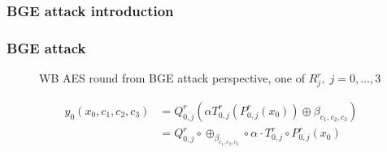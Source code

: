 \documentclass{beamer}
\begin{document}
\subsubsection{BGE attack introduction}
\begin{frame}
  \frametitle{BGE attack}
    \begin{figure}
    \begin{center}
    \leavevmode
    \centerline{}
    \end{center}
    \caption{WB AES round from BGE attack perspective, one of $R^r_j,\; j=0,\dots,3$}
    \label{fig:aes_round_bge}
    \end{figure} 

     \begin{equation} \label{eq:y0}    
    \begin{aligned}
    y_0\left(x_0, c_1, c_2, c_3 \right) &= Q^r_{0,j} \left(\alpha T^r_{0,j}\left(P^r_{0,j}\left(x_0\right)\right) \oplus \beta_{c_1,c_2,c_3}\right) \\
				        &= Q^r_{0,j} \circ \oplus_{\beta_{c_1,c_2,c_3}} \circ \alpha \cdot T^r_{0,j} \circ P^r_{0,j} \left(x_0\right)
    \end{aligned}
    \end{equation}
\end{frame}
\end{document}
